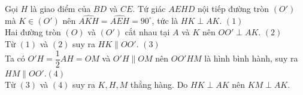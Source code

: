 \begin{vd}
{\begin{center}
		\end{center}
		Gọi $H$ là giao điểm của $BD$ và $CE$. Tứ giác $AEHD$ nội tiếp đường tròn $(O')$ mà $K \in (O')$ nên $\widehat{AKH} = \widehat{AEH} =90^\circ$, tức là $HK \perp AK$. \hfill$(1)$ \\
		Hai đường  tròn $(O)$ và $(O')$ cắt nhau tại $A$ và $K$ nên $OO' \perp AK$. \hfill$(2)$ \\
		Từ $(1)$ và $(2)$ suy ra $HK \parallel OO'$. \hfill $(3)$  \\
		Ta có $O'H =\dfrac{1}{2}AH =OM$ và $O'H \parallel OM$ nên $OO'HM$ là hình bình hành, suy ra $HM \parallel OO'$.\hfill $(4)$ \\
		Từ $(3)$ và $(4)$  suy ra $K,H,M$ thẳng hàng. Do $HK \perp AK$ nên $KM \perp AK$. 
	}
\end{vd}


